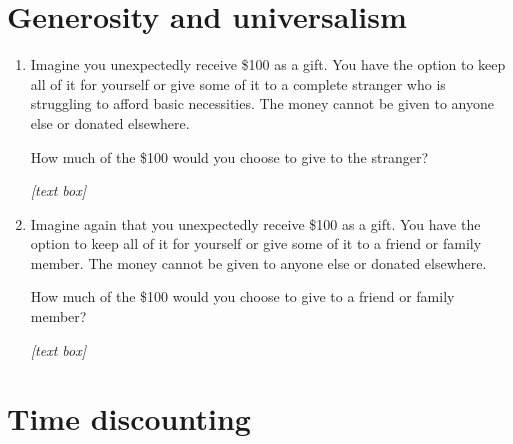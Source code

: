 \documentclass[11pt, headsepline]{article}
\begin{document}
\section*{Generosity and universalism}

\begin{enumerate}[resume]

    \item Imagine you unexpectedly receive \$100 as a gift. You have the option to keep all of it for yourself or give some of it to a complete stranger who is struggling to afford basic necessities. The money cannot be given to anyone else or donated elsewhere.

    How much of the \$100 would you choose to give to the stranger?

    \textit{[text box]}

    \item Imagine again that you unexpectedly receive \$100 as a gift. You have the option to keep all of it for yourself or give some of it to a friend or family member. The money cannot be given to anyone else or donated elsewhere.

    How much of the \$100 would you choose to give to a friend or family member?

    \textit{[text box]}






    
\end{enumerate}

\section*{Time discounting}
\end{document}
